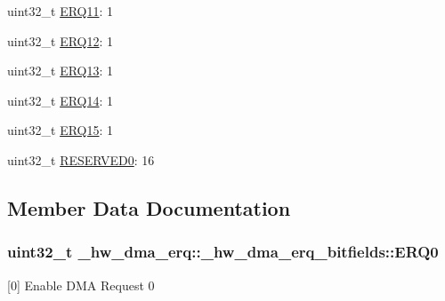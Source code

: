 \begin{DoxyCompactItemize}
\item 
uint32\+\_\+t \hyperlink{struct__hw__dma__erq_1_1__hw__dma__erq__bitfields_a969a4cd49e948733f660ff5c10534362}{E\+R\+Q11}\+: 1
\item 
uint32\+\_\+t \hyperlink{struct__hw__dma__erq_1_1__hw__dma__erq__bitfields_a145e495e5f5f2cab07b87ab9921e9957}{E\+R\+Q12}\+: 1
\item 
uint32\+\_\+t \hyperlink{struct__hw__dma__erq_1_1__hw__dma__erq__bitfields_a9c617afa76e92d6e18eefe9fa72446c2}{E\+R\+Q13}\+: 1
\item 
uint32\+\_\+t \hyperlink{struct__hw__dma__erq_1_1__hw__dma__erq__bitfields_afc5a0871addb370f9ee43d6cbab6d5bd}{E\+R\+Q14}\+: 1
\item 
uint32\+\_\+t \hyperlink{struct__hw__dma__erq_1_1__hw__dma__erq__bitfields_ab096dedaaf1f480e4e0ae3b4100edc8d}{E\+R\+Q15}\+: 1
\item 
uint32\+\_\+t \hyperlink{struct__hw__dma__erq_1_1__hw__dma__erq__bitfields_aa7f2bbe874bbfd8f462f664b89e87a1d}{R\+E\+S\+E\+R\+V\+E\+D0}\+: 16
\end{DoxyCompactItemize}


\subsection{Member Data Documentation}
\subsubsection[{\texorpdfstring{E\+R\+Q0}{ERQ0}}]{\setlength{\rightskip}{0pt plus 5cm}uint32\+\_\+t \+\_\+hw\+\_\+dma\+\_\+erq\+::\+\_\+hw\+\_\+dma\+\_\+erq\+\_\+bitfields\+::\+E\+R\+Q0}\hypertarget{struct__hw__dma__erq_1_1__hw__dma__erq__bitfields_a04690414e631ebfbd7ef1670e1d95c09}{}\label{struct__hw__dma__erq_1_1__hw__dma__erq__bitfields_a04690414e631ebfbd7ef1670e1d95c09}
\mbox{[}0\mbox{]} Enable D\+MA Request 0 
